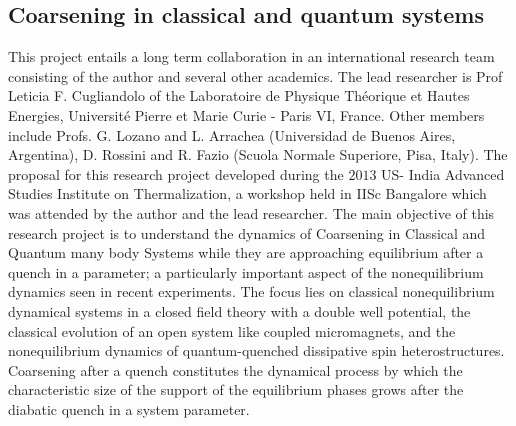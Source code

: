 \documentclass[a4paper,10pt]{report}
\begin{document}
\subsection{Coarsening in classical and quantum systems}
\label{subsec:ccqs}
This project entails a long term collaboration in an international research team consisting of the author and several other academics.  The lead researcher is Prof Leticia F. Cugliandolo of the Laboratoire de Physique Th\'eorique et Hautes Energies, Universit\'e Pierre et Marie Curie - Paris VI, France. Other members include Profs. G. Lozano and L. Arrachea (Universidad de Buenos Aires, Argentina), D. Rossini  and R. Fazio (Scuola Normale Superiore, Pisa, Italy). The proposal for this research project developed during the $2013$ US- India Advanced Studies Institute on Thermalization, a workshop held in IISc Bangalore which was attended by the author and the lead researcher. The main objective of this research project is to understand the dynamics of {Coarsening} in {Classical} and {Quantum} many body {Systems} while they are approaching equilibrium after a quench in a  {parameter}; a particularly important aspect of the nonequilibrium dynamics seen in recent experiments. The focus lies on classical nonequilibrium dynamical systems in a closed field theory with a double well potential, the classical evolution of an open system like coupled micromagnets, and the nonequilibrium dynamics of quantum-quenched dissipative spin heterostructures. Coarsening after a quench constitutes the dynamical process by which the characteristic  {size} of the support of the equilibrium phases grows after the diabatic quench in a system parameter.
\end{document}
